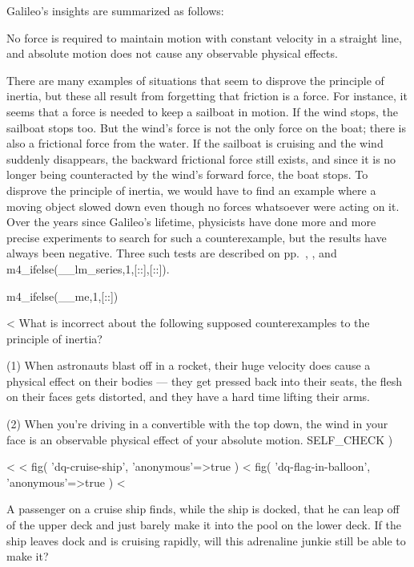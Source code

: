 Galileo's insights are summarized as follows:

\begin{important}\label{principle-of-inertia}
No force is required to maintain motion with constant velocity in
a straight line, and absolute motion does not cause any
observable physical effects.
\end{important}

There are many examples of situations that seem to disprove
the principle of inertia, but these all result from
forgetting that friction is a force. For instance, it seems
that a force is needed to keep a sailboat in motion. If the
wind stops, the sailboat stops too. But the wind's force is
not the only force on the boat; there is also a frictional
force from the water. If the sailboat is cruising and the
wind suddenly disappears, the backward frictional force
still exists, and since it is no longer being counteracted
by the wind's forward force, the boat stops. To disprove the
principle of inertia, we would have to find an example where
a moving object slowed down even though no forces whatsoever were acting on it.
Over the years since Galileo's lifetime, physicists have done more and more precise
experiments to search for such a counterexample, but the results have always been negative.
Three such tests are described on pp.~\pageref{sec:galileo-ramps-inertia},
\pageref{eg:clock-comparison-inertia}, and
m4_ifelse(__lm_series,1,[:\pageref{sec:battat}:],[:\pageref{battat}:]).\label{first-law-evidence}

m4_ifelse(__me,1,[:\enlargethispage{\baselineskip}:])

<%
What is incorrect about the following supposed counterexamples
to the principle of inertia?

(1) When astronauts blast off in a rocket, their huge
velocity does cause a physical effect on their bodies ---
they get pressed back into their seats, the flesh on their
faces gets distorted, and they have a hard time lifting their arms.

(2) When you're driving in a convertible with the top down,
the wind in your face is an observable physical effect of
your absolute motion.
  SELF_CHECK
  ) %


\startdqs

<%
<%
  fig(
    'dq-cruise-ship',
    {
      'anonymous'=>true
    }
  )
\spacebetweenfigs
<%
  fig(
    'dq-flag-in-balloon',
    {
      'anonymous'=>true
    }
  )
<%
\begin{dq}\label{dq:cruise-ship}
A passenger on a cruise ship finds, while the ship is
docked, that he can leap off of the upper deck and just
barely make it into the pool on the lower deck.  If the ship
leaves dock and is cruising rapidly, will this adrenaline
junkie still be able to make it?
\end{dq}

